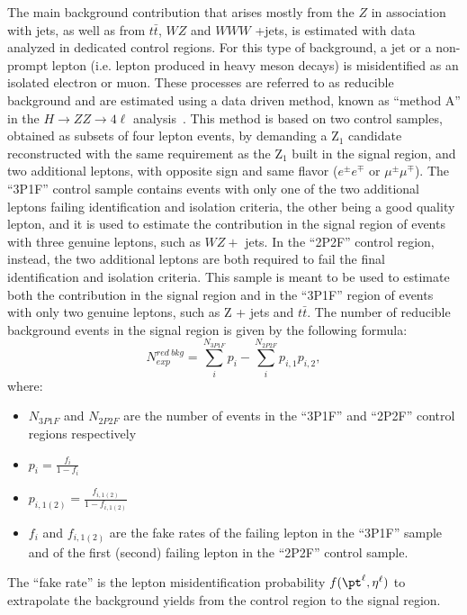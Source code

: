 The main background contribution that arises mostly from the $Z$ in association with jets, as well as from $t\bar{t}$, $WZ$ and
$WWW$ +jets, is estimated with data analyzed in dedicated control regions.
For this type of background, a jet or a non-prompt lepton (i.e. lepton produced in heavy meson decays) is misidentified as an isolated 
electron or muon. These processes are referred to as reducible background and are estimated using a data driven method, known
as ``method A'' in the $H\to ZZ \to 4\ell$ analysis~\cite{HiggsLegacyPaper}. This method is based on two control samples, obtained 
as subsets of four lepton events, by demanding a Z$_1$ candidate reconstructed with the same requirement as the  Z$_1$ built in the signal region, and two additional leptons, with opposite sign and same flavor ($e^\pm e^\mp$ or $\mu^\pm\mu^\mp$). The ``3P1F'' control sample contains events with only one of the two additional leptons failing identification and isolation 
criteria, the other being a good quality lepton, and it is used to estimate the contribution in the signal region of events with three genuine leptons, such as 
$WZ +$ jets.
In the ``2P2F'' control region, instead, the two additional leptons  are  both required  to  fail the final identification and isolation criteria. This  sample  is  meant  to  be  used  to  estimate  
both the  contribution  in  the  signal region and in the ``3P1F'' region of events with only two genuine leptons, such as Z + jets and $t\bar{t}$.  
The number of reducible background events in the signal region is given by the following formula:
\begin{equation}
\label{eq:redBkg_methA}
N^{red\ bkg}_{exp} = \sum_{i}^{N_{3P1F}} p_{i}- \sum_{i}^{N_{2P2F}} p_{i,1} p_{i,2},  
\end{equation}
where:
\begin{itemize}
\item $N_{3P1F}$ and $N_{2P2F}$ are the number of events in the ``3P1F'' and ``2P2F'' control regions respectively
\item $p_{i} = \frac{f_{i}}{1-f_{i}}$
\item $p_{i,1(2)} = \frac{f_{i,1(2)}}{1-f_{i,1(2)}}$
\item $f_{i}$  and $f_{i,1(2)}$ are the fake rates of the failing lepton in the ``3P1F'' sample and of the first (second) failing lepton in the ``2P2F'' control sample. 
\end{itemize}
The ``fake rate'' is the lepton misidentification probability $f(\pt^{\ell},\eta^{\ell})$
to extrapolate the background yields from the control region to the signal region. 
